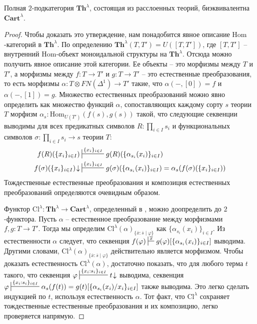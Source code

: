 \documentclass[reqno]{amsart}
\theoremstyle{definition}
\theoremstyle{remark}
\newcommand{\bcat}[1]{\mathbf{#1}}
\newcommand{\fs}[1]{\mathrm{#1}}
\newcommand{\Hom}{\fs{Hom}}
\newcommand{\Th}{\bcat{Th}}
\begin{document}
\begin{thm}
Полная $2$-подкатегория $\Th^\lambda$, состоящая из расслоенных теорий, биэквивалентна $\bcat{Cart}^\lambda$.
\end{thm}
\begin{proof}
Чтобы доказать это утверждение, нам понадобится явное описание $\Hom$-категорий в $\Th^\lambda$.
По определению $\Th^\lambda(T,T') = U([T,T'])$, где $[T,T']$ -- внутренний $\Hom$-объект моноидальной структуры на $\Th^\lambda$.
Отсюда можно получить явное описание этой категории.
Ее объекты -- это морфизмы между $T$ и $T'$, а морфизмы между $f : T \to T'$ и $g : T \to T'$ -- это естественные преобразования, то есть морфизмы $\alpha : T \otimes FN(\Delta^1) \to T'$ такие, что $\alpha(-,[0]) = f$ и $\alpha(-,[1]) = g$.
Множество естественных преобразований можно явно определить как множество функций $\alpha$, сопоставляющих каждому сорту $s$ теории $T$ морфизм $\alpha_s : \Hom_{U(T')}(f(s),g(s))$ такой, что следующие секвенции выводимы
для всех предикатных символов $R : \prod_{i \in I} s_i$ и функциональных символов $\sigma : \prod_{i \in I} s_i \to s$ теории $T$:
\begin{align*}
f(R)(\{ x_i \}_{i \in I}) & \sststile{}{\{ x_i \}_{i \in I}} g(R)(\{ \alpha_{s_i}(x_i) \}_{i \in I}) \\
f(\sigma)(\{ x_i \}_{i \in I})\!\downarrow & \sststile{}{\{ x_i \}_{i \in I}} g(\sigma)(\{ \alpha_{s_i}(x_i) \}_{i \in I}) = \alpha_s(f(\sigma)(\{ x_i \}_{i \in I}))
\end{align*}
Тождественные естественные преобразования и композиция естественных преобразований определяются очевидным образом.

Функтор $\fs{Cl}^\lambda : \Th^\lambda \to \bcat{Cart}^\lambda$, определенный в , можно доопределить до $2$-функтора.
Пусть $\alpha$ -- естественное преобразование между морфизмами $f,g : T \to T'$.
Тогда мы определим $\fs{Cl}^\lambda(\alpha)_{\{ \overline{x} : \overline{s} \mid \varphi \}}$ как $\{ \alpha_{s_i}(x_i) \}_{i \in I}$.
Из естественности $\alpha$ следует, что секвенция $f(\varphi) \sststile{}{\overline{x}} g(\varphi)[\{ \alpha_{s_i}(x_i) \}_{i \in I}]$ выводима.
Другими словами, $\fs{Cl}^\lambda(\alpha)_{\{ \overline{x} : \overline{s} \mid \varphi \}}$ действительно является морфизмом.
Чтобы доказать естественность $\fs{Cl}^\lambda(\alpha)$, достаточно показать, что для любого терма $t$ такого, что секвенция $\varphi \sststile{}{\{ x_i : s_i \}_{i \in I}} t\!\downarrow$ выводима,
секвенция $\varphi \sststile{}{\{ x_i : s_i \}_{i \in I}} \alpha_s(f(t)) = g(t)[\{ \alpha_{s_i}(x_i)/x_i \}_{i \in I}]$ также выводима.
Это легко сделать индукцией по $t$, используя естественность $\alpha$.
Тот факт, что $\fs{Cl}^\lambda$ сохраняет тождественные естественные преобразования и их композицию, легко проверяется напрямую.


\end{proof}
\end{document}
